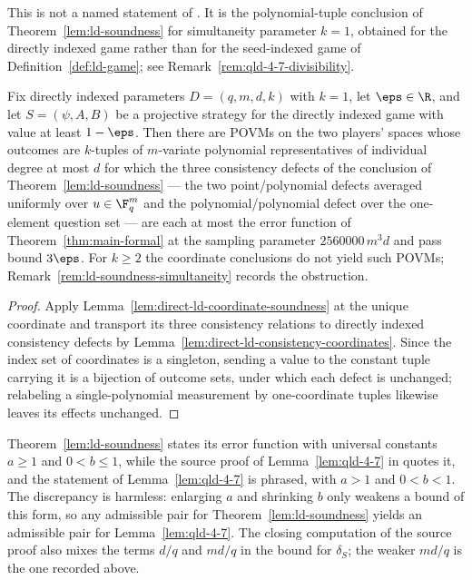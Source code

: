\begin{lemma}
	\label{lem:direct-ld-simultaneous-single}
	\leanok
	This is not a named statement of \cite{Ji2020MIPStar}. It is the
	polynomial-tuple conclusion of Theorem~\ref{lem:ld-soundness} for
	simultaneity parameter $k=1$, obtained for the directly indexed game rather
	than for the seed-indexed game of Definition~\ref{def:ld-game}; see
	Remark~\ref{rem:qld-4-7-divisibility}.

	Fix directly indexed parameters $D=(q,m,d,k)$ with $k=1$, let $\eps\in\R$,
	and let $S=(\psi,A,B)$ be a projective strategy for the directly indexed game
	with value at least $1-\eps$. Then there are POVMs on the two players' spaces
	whose outcomes are $k$-tuples of $m$-variate polynomial representatives of
	individual degree at most $d$ for which the three consistency defects of the
	conclusion of Theorem~\ref{lem:ld-soundness} --- the two point/polynomial
	defects averaged uniformly over $u\in\F_q^m$ and the polynomial/polynomial
	defect over the one-element question set --- are each at most the error
	function of Theorem~\ref{thm:main-formal} at the sampling parameter
	$2560000\,m^3d$ and pass bound $3\eps$. For $k\ge2$ the coordinate
	conclusions do not yield such POVMs;
	Remark~\ref{rem:ld-soundness-simultaneity} records the obstruction.
\end{lemma}
\begin{proof}
	\leanok
	Apply Lemma~\ref{lem:direct-ld-coordinate-soundness} at the unique coordinate
	and transport its three consistency relations to directly indexed consistency
	defects by Lemma~\ref{lem:direct-ld-consistency-coordinates}. Since the index
	set of coordinates is a singleton, sending a value to the constant tuple
	carrying it is a bijection of outcome sets, under which each defect is
	unchanged; relabeling a single-polynomial measurement by one-coordinate
	tuples likewise leaves its effects unchanged.
\end{proof}

\begin{remark}
	\label{rem:qld-4-7-constants}
	Theorem~\ref{lem:ld-soundness} states its error function with universal
	constants $a \ge 1$ and $0 < b \le 1$, while the source proof of
	Lemma~\ref{lem:qld-4-7} in \cite{Ji2020MIPStar} quotes it, and the
	statement of Lemma~\ref{lem:qld-4-7} is phrased, with $a > 1$ and
	$0 < b < 1$. The discrepancy is harmless: enlarging $a$ and shrinking
	$b$ only weakens a bound of this form, so any admissible pair for
	Theorem~\ref{lem:ld-soundness} yields an admissible pair for
	Lemma~\ref{lem:qld-4-7}. The closing computation of the source proof
	also mixes the terms $d/q$ and $md/q$ in the bound for $\delta_S$; the
	weaker $md/q$ is the one recorded above.
\end{remark}

